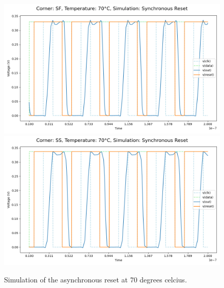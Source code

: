 \begin{figure}[H]
    \vspace{5pt}
    \includegraphics[height= 0.21\textheight]{figures/aimspice/SF/70/W3.csv.png}
    \vspace{5pt}
    \includegraphics[height= 0.21\textheight]{figures/aimspice/SS/70/W3.csv.png}
    \caption{Simulation of the asynchronous reset at 70 degrees celcius.}
    \label{fig:aimspice_W3_70}
\end{figure}